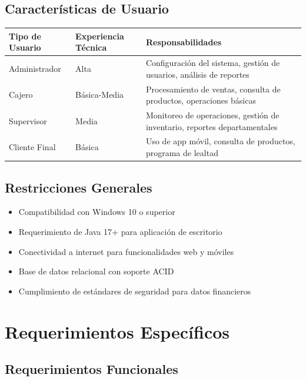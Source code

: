 \documentclass[12pt,letterpaper]{article}
\begin{document}
\subsection{Características de Usuario}

\begin{longtable}{|p{3cm}|p{4cm}|p{8cm}|}
\hline
\rowcolor{cobrablue!20}
\textbf{Tipo de Usuario} & \textbf{Experiencia Técnica} & \textbf{Responsabilidades} \\
\hline
\endhead
Administrador & Alta & Configuración del sistema, gestión de usuarios, análisis de reportes \\
\hline
Cajero & Básica-Media & Procesamiento de ventas, consulta de productos, operaciones básicas \\
\hline
Supervisor & Media & Monitoreo de operaciones, gestión de inventario, reportes departamentales \\
\hline
Cliente Final & Básica & Uso de app móvil, consulta de productos, programa de lealtad \\
\hline
\end{longtable}

\subsection{Restricciones Generales}
\begin{itemize}
    \item Compatibilidad con Windows 10 o superior
    \item Requerimiento de Java 17+ para aplicación de escritorio
    \item Conectividad a internet para funcionalidades web y móviles
    \item Base de datos relacional con soporte ACID
    \item Cumplimiento de estándares de seguridad para datos financieros
\end{itemize}

\section{Requerimientos Específicos}

\subsection{Requerimientos Funcionales}
\end{document}
